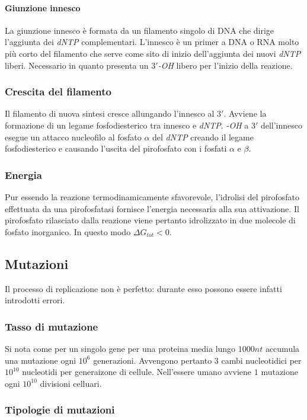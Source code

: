 			\paragraph{Giunzione innesco}
			La giunzione innesco \`e formata da un filamento singolo di DNA che dirige l'aggiunta dei \emph{dNTP} complementari.
			L'innesco \`e un primer a DNA o RNA molto pi\`u corto del filamento che serve come sito di inizio dell'aggiunta dei nuovi \emph{dNTP} liberi.
			Necessario in quanto presenta un \emph{$3'$-OH} libero per l'inizio della reazione.

		\subsubsection{Crescita del filamento}
		Il filamento di nuova sintesi cresce allungando l'innesco al $3'$.
		Avviene la formazione di un legame fosfodiesterico tra innesco e \emph{dNTP}.
		\emph{-OH} a $3'$ dell'innesco esegue un attacco nucleofilo al fosfato $\alpha$ del \emph{dNTP} creando il legame fosfodiesterico e causando l'uscita del pirofosfato con i fosfati $\alpha$ e $\beta$.

		\subsubsection{Energia}
		Pur essendo la reazione termodinamicamente sfavorevole, l'idrolisi del pirofosfato effettuata da una pirofosfatasi fornisce l'energia necessaria alla sua attivazione.
		Il pirofosfato rilasciato dalla reazione viene pertanto idrolizzato in due molecole di fosfato inorganico.
		In questo modo $\Delta G_{tot} < 0$.

	\subsection{Mutazioni}
	Il processo di replicazione non \`e perfetto: durante esso possono essere infatti introdotti errori.
	
		\subsubsection{Tasso di mutazione}
		Si nota come per un singolo gene per una proteina media lungo $1000nt$ accumula una mutazione ogni $10^6$ generazioni.
		Avvengono pertanto $3$ cambi nucleotidici per $10^{10}$ nucleotidi per generaizone di cellule.
		Nell'essere umano avviene $1$ mutazione ogni $10^{10}$ divisioni celluari.

		\subsubsection{Tipologie di mutazioni}

